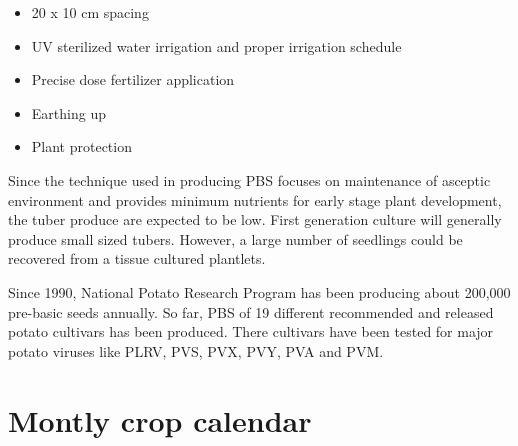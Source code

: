 \documentclass[
  openany]{book}
\providecommand{\tightlist}{%
  \setlength{\itemsep}{0pt}\setlength{\parskip}{0pt}}
\begin{document}
\begin{itemize}
  \begin{itemize}
  \tightlist
  \item
    20 x 10 cm spacing
  \item
    UV sterilized water irrigation and proper irrigation schedule
  \item
    Precise dose fertilizer application
  \item
    Earthing up
  \item
    Plant protection
  \end{itemize}
\end{itemize}

Since the technique used in producing PBS focuses on maintenance of asceptic environment and provides minimum nutrients for early stage plant development, the tuber produce are expected to be low. First generation culture will generally produce small sized tubers. However, a large number of seedlings could be recovered from a tissue cultured plantlets.

Since 1990, National Potato Research Program has been producing about 200,000 pre-basic seeds annually. So far, PBS of 19 different recommended and released potato cultivars has been produced. There cultivars have been tested for major potato viruses like PLRV, PVS, PVX, PVY, PVA and PVM.

\hypertarget{montly-crop-calendar}{%
\section{Montly crop calendar}\label{montly-crop-calendar}}
\end{document}
